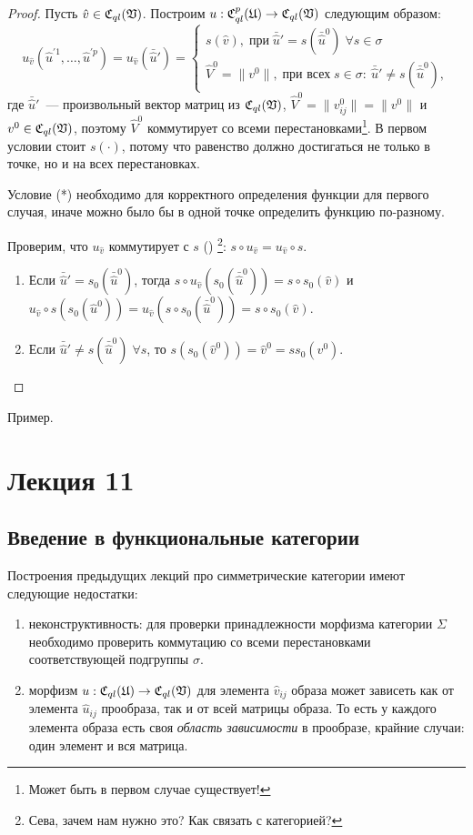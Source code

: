 \documentclass[a4paper, 12pt]{report}
\begin{document}
\begin{proof}
Пусть $\hat{v} \in \mathfrak{C}_{ql}(\mathfrak{V})$. Построим $u: \mathfrak{C}_{ql}^p(\mathfrak{U}) \rightarrow \mathfrak{C}_{ql}(\mathfrak{V})$ следующим образом:
\[
u_{\hat{v}}(\hat{u}^{'1}, \ldots, \hat{u}^{'p}) = u_{\hat{v}}(\bar{\hat{u}}') =
\begin{cases}
s(\hat{v}),\; \text{при} \; \bar{\hat{u}}' = s(\bar{\hat{u}}^0) \; \forall s \in \sigma\\
\hat{V}^0 = \| v^0 \|, \; \text{при всех} \; s \in \sigma: \ \bar{\hat{u}}' \neq s(\bar{\hat{u}}^0),
\end{cases}
\]
где $\bar{\hat{u}}'$~--- произвольный вектор матриц из $\mathfrak{C}_{ql}(\mathfrak{V})$, $\hat{V}^0 = \| v^0_{ij} \| = \| v^0 \|$ и $v^0 \in \mathfrak{C}_{ql}(\mathfrak{V})$, поэтому $\hat{V}^0$ коммутирует со всеми перестановками\footnote{Может быть в первом случае существует!}. В первом условии стоит $s(\cdot)$, потому что равенство должно достигаться не только в точке, но и на всех перестановках.

Условие (*) необходимо для корректного определения функции для первого случая, иначе можно было бы в одной точке определить функцию по-разному.

Проверим, что $u_{\hat{v}}$ коммутирует с $s$ () \footnote{Сева, зачем нам нужно это? Как связать с категорией?}: $s \circ u_{\hat{v}} = u_{\hat{v}} \circ s$.
\begin{enumerate}
\item Если $\bar{\hat{u}}' = s_0(\bar{\hat{u}}^0)$, тогда $s \circ u_{\hat{v}}(s_0(\bar{\hat{u}}^0)) = s \circ s_0(\hat{v})$ и $u_{\hat{v}} \circ s(s_0(\hat{u}^0)) = u_{\hat{v}}(s \circ s_0(\bar{\hat{u}}^0)) = s \circ s_0(\hat{v})$.
\item Если $\bar{\hat{u}}' \neq s(\bar{\hat{u}}^0) \; \forall s$, то $s(s_0(\hat{v}^0)) = \hat{v}^0 = ss_0(v^0)$.
\end{enumerate}
\end{proof}
Пример.

\chapter{Лекция 11}
\section{Введение в функциональные категории}
Построения предыдущих лекций про симметрические категории имеют следующие недостатки:
\begin{enumerate}[1)]
\item неконструктивность: для проверки принадлежности морфизма категории $\Sigma$ необходимо проверить коммутацию со всеми перестановками соответствующей подгруппы $\sigma$.
\item морфизм $u: \mathfrak{C}_{ql}(\mathfrak{U}) \rightarrow \mathfrak{C}_{ql}(\mathfrak{V})$ для элемента $\hat{v}_{ij}$ образа может зависеть как от элемента $\hat{u}_{ij}$ прообраза, так и от всей матрицы образа. То есть у каждого элемента образа есть своя \emph{область зависимости} в прообразе, крайние случаи: один элемент и вся матрица.
\end{enumerate}
\end{document}
